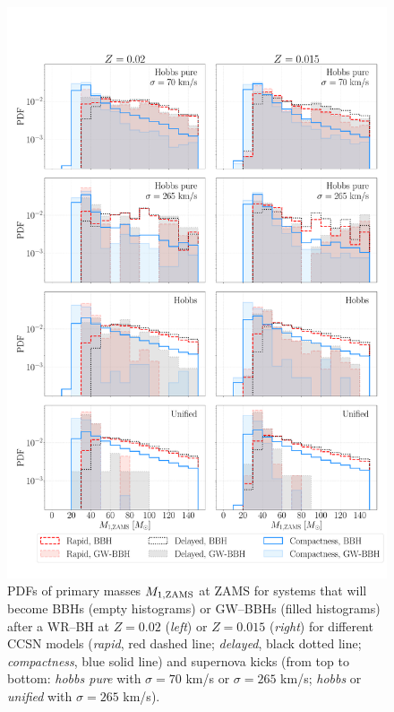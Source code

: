 \documentclass[a4paper,titlepage]{book}     	%
\begin{document}
\begin{figure}
	\centering
	\includegraphics[width=\textwidth]{./images/progM1.pdf}	
	\caption{PDFs of primary masses $M_{\rm 1,ZAMS}$ at ZAMS for systems that will become BBHs (empty histograms) or GW--BBHs (filled histograms) after a WR--BH at $Z=0.02$ (\emph{left}) or $Z=0.015$ (\emph{right}) for different CCSN models (\emph{rapid}, red dashed line; \emph{delayed}, black dotted line; \emph{compactness}, blue solid line) and supernova kicks (from top to bottom: \emph{hobbs pure} with $\sigma = 70$ km/s or $\sigma = 265$ km/s; \emph{hobbs} or \emph{unified} with $\sigma = 265$ km/s).}\label{fig:resultsM1prog}
\end{figure}
\end{document}
